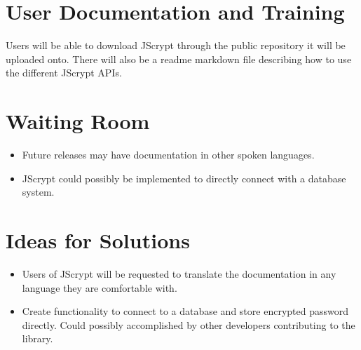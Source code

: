 \documentclass[12pt]{article}
\begin{document}
\section {User Documentation and Training}
Users will be able to download JScrypt through the public repository it will be uploaded onto. There will also be a readme markdown file describing how to use the different JScrypt APIs.

\section{Waiting Room}
\begin{itemize}
  \item Future releases may have documentation in other spoken languages.
  \item JScrypt could possibly be implemented to directly connect with a database system.
  \end{itemize}


\section{Ideas for Solutions}
\begin{itemize}
  \item Users of JScrypt will be requested to translate the documentation in any language they are comfortable with.
  \item Create functionality to connect to a database and store encrypted password directly. Could possibly accomplished by other developers contributing to the library.
  \end{itemize}
  \newpage
\end{document}

